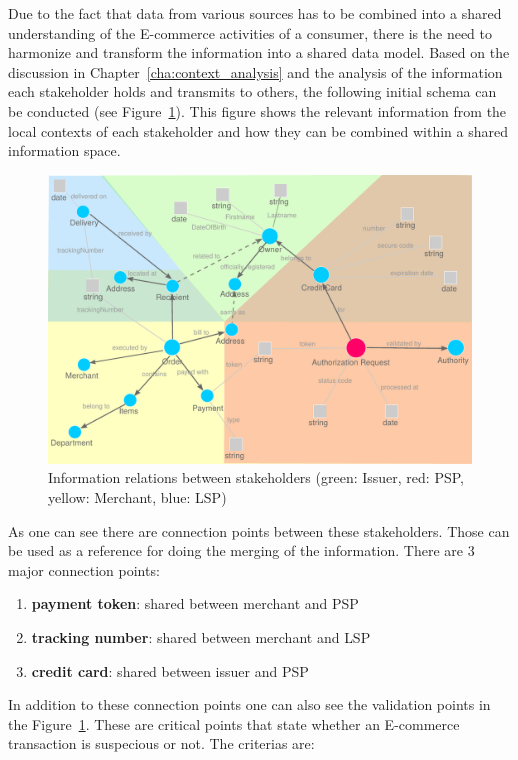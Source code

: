 Due to the fact that data from various sources has to be combined into a shared understanding of the E-commerce activities of a consumer, there is the need to harmonize and transform the information into a shared data model. Based on the discussion in Chapter~\ref{cha:context_analysis} and the analysis of the information each stakeholder holds and transmits to others, the following initial schema can be conducted (see Figure~\ref{fig:images_data_model}). This figure shows the relevant information from the local contexts of each stakeholder and how they can be combined within a shared information space. \\

\begin{figure}[!ht]
  \centering
  \includegraphics[width=0.9\columnwidth]{images/ontology_scenario_1.pdf}
  \caption{Information relations between stakeholders (green: Issuer, red: \gls{PSP}, yellow: Merchant, blue: \gls{LSP})}
\label{fig:images_data_model}
\end{figure}

As one can see there are connection points between these stakeholders. Those can be used as a reference for doing the merging of the information. There are 3 major connection points: \@

\begin{enumerate}
  \item \textbf{payment token}: shared between merchant and \gls{PSP}
  \item \textbf{tracking number}: shared between merchant and \gls{LSP}
  \item \textbf{credit card}: shared between issuer and \gls{PSP}
\end{enumerate}

In addition to these connection points one can also see the validation points in the Figure~\ref{fig:images_data_model}. These are critical points that state whether an E-commerce transaction is suspecious or not. The criterias are: \@

